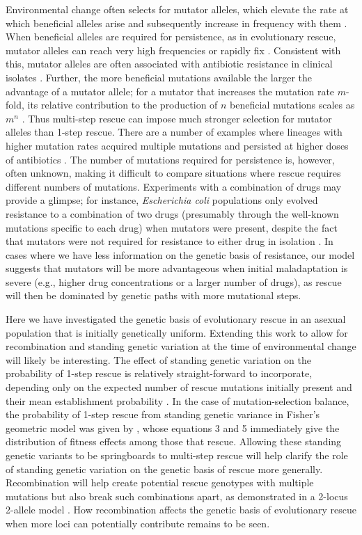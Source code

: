 \documentclass[9pt,twocolumn,twoside,lineno]{gsajnl}
\begin{document}
Environmental change often selects for mutator alleles, which elevate the rate at which beneficial alleles arise and subsequently increase in frequency with them \citep{tenaillon2001second}.
When beneficial alleles are required for persistence, as in evolutionary rescue, mutator alleles can reach very high frequencies or rapidly fix \citep[e.g.,][]{mao1997proliferation}.
Consistent with this, mutator alleles are often associated with antibiotic resistance in clinical isolates \citep[see examples in][]{Bell2017}.
Further, the more beneficial mutations available the larger the advantage of a mutator allele; for a mutator that increases the mutation rate $m$-fold, its relative contribution to the production of $n$ beneficial mutations scales as $m^n$ \citep{tenaillon1999mutators}.
Thus multi-step rescue can impose much stronger selection for mutator alleles than 1-step rescue.
There are a number of examples where lineages with higher mutation rates acquired multiple mutations and persisted at higher doses of antibiotics \citep{couce2015bypass,san2017multicopy}.
The number of mutations required for persistence is, however, often unknown, making it difficult to compare situations where rescue requires different numbers of mutations.
Experiments with a combination of drugs may provide a glimpse; for instance, \textit{Escherichia coli} populations only evolved resistance to a combination of two drugs (presumably through the well-known mutations specific to each drug) when mutators were present, despite the fact that mutators were not required for resistance to either drug in isolation \citep{gifford2019mutators}. 
In cases where we have less information on the genetic basis of resistance, our model suggests that mutators will be more advantageous when initial maladaptation is severe (e.g., higher drug concentrations or a larger number of drugs), as rescue will then be dominated by genetic paths with more mutational steps.

Here we have investigated the genetic basis of evolutionary rescue in an asexual population that is initially genetically uniform. 
Extending this work to allow for recombination and standing genetic variation at the time of environmental change will likely be interesting. 
The effect of standing genetic variation on the probability of 1-step rescue is relatively straight-forward to incorporate, depending only on the expected number of rescue mutations initially present and their mean establishment probability \citep{Martin2013}. 
In the case of mutation-selection balance, the probability of 1-step rescue from standing genetic variance in Fisher's geometric model was given by \cite{Anciaux2018}, whose equations 3 and 5 immediately give the distribution of fitness effects among those that rescue.
Allowing these standing genetic variants to be springboards to multi-step rescue will help clarify the role of standing genetic variation on the genetic basis of rescue more generally.
Recombination will help create potential rescue genotypes with multiple mutations but also break such combinations apart, as demonstrated in a 2-locus 2-allele model \citep{Uecker2016}.
How recombination affects the genetic basis of evolutionary rescue when more loci can potentially contribute remains to be seen.
\end{document}
